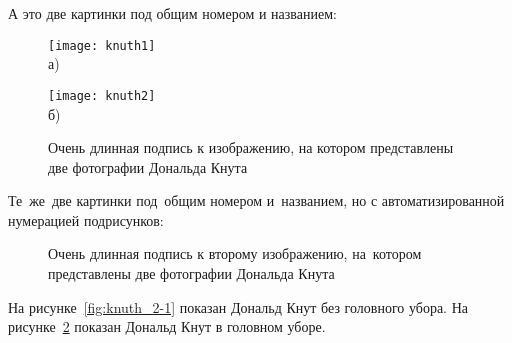 А это две картинки под общим номером и названием:
\begin{figure}[ht]
  \begin{minipage}[b][][b]{0.49\linewidth}\centering
    \texttt{[image: knuth1]} \\ а)
  \end{minipage}
  \hfill
  \begin{minipage}[b][][b]{0.49\linewidth}\centering
    \texttt{[image: knuth2]} \\ б)
  \end{minipage}
  \caption{Очень длинная подпись к изображению,
      на котором представлены две фотографии Дональда Кнута}
  \label{fig:knuth}
\end{figure}

Те~же~две картинки под~общим номером и~названием,
но с автоматизированной нумерацией подрисунков:
\begin{figure}[ht]
    \caption[Этот текст попадает в названия рисунков в списке рисунков]{Очень
    длинная подпись к второму изображению, на~котором представлены две
    фотографии Дональда Кнута}\label{fig:knuth_2}
\end{figure}

На рисунке~\cref{fig:knuth_2-1} показан Дональд Кнут без головного убора.
На рисунке~\cref{fig:knuth_2}
показан Дональд Кнут в головном уборе.

